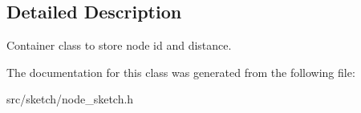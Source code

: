 \subsection{Detailed Description}
Container class to store node id and distance. 

The documentation for this class was generated from the following file\+:\begin{DoxyCompactItemize}
\item 
src/sketch/node\+\_\+sketch.\+h\end{DoxyCompactItemize}
